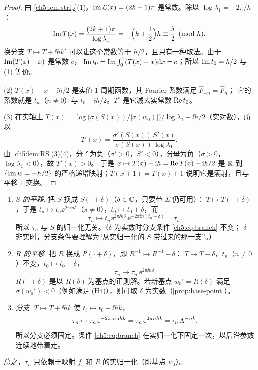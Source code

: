 \begin{proof}
由 \cref{ch5:lem:strip}(1)，$\operatorname{Im}\mathcal L(x)=(2k+1)\pi$ 是常数。除以 $\log\lambda_1=-2\pi/h$：
\[
 \operatorname{Im} T(x)=\frac{(2k+1)\pi}{\log\lambda_1}=-\Bigl(k+\frac12\Bigr)h\equiv\frac h2\pmod h .
\]
换分支 $T\mapsto T+\ii hk'$ 可以让这个常数等于 $h/2$，且只有一种取法。由于 $\operatorname{Im}(T(x)-x)$ 是常数 $c$，
$\operatorname{Im} t_0=\operatorname{Im}\int_0^1(T(x)-x)\mathrm{d} x=c$；所以 $\operatorname{Im} t_0=h/2$ 与 (1) 等价。

(2) $T(x)-x-\ii h/2$ 是实值 $1$-周期函数，其 Fourier 系数满足 $\hat F_{-n}=\overline{\hat F_n}$；
它的系数就是 $t_n$（$n\ne0$）与 $t_0-\ii h/2$。$T^\circ$ 是它减去实常数 $\operatorname{Re} t_0$。

(3) 在实轴上 $T(x)=\log\bigl(\sigma(S(x))/|\sigma(w_0)|\bigr)/\log\lambda_1+\ii h/2$（实对数），所以
\[
 T'(x)=\frac{\sigma'(S(x))\,S'(x)}{\sigma(S(x))\,\log\lambda_1}.
\]
由 \cref{ch5:lem:RS}(3)(4)，分子为负（$\sigma'>0$，$S'<0$），分母为负（$\sigma>0$，$\log\lambda_1<0$），故 $T'(x)>0$。
于是 $x\mapsto T(x)-\mathrm{i} h=\operatorname{Re} T(x)-\mathrm{i} h/2$ 是 $\mathbb{R}$ 到 $\{\operatorname{Im} w=-h/2\}$ 的严格递增映射；$T(x+1)=T(x)+1$
说明它是满射，且与平移 $1$ 交换。
\end{proof}

\begin{remark}\label{ch5:rem:normalisations}
\begin{enumerate}
\item \emph{$S$ 的平移.} 把 $S$ 换成 $S(\cdot+\delta)$（$\delta\in\mathbb{C}$，只要带 $\Sigma$ 仍可用）：
  $T\mapsto T(\cdot+\delta)$，于是 $t_n\mapsto t_n\ee^{2\pi\ii n\delta}$（$n\ne0$），$t_0\mapsto t_0+\delta$，而
  \[
   \tau_n\mapsto t_n\ee^{2\pi\ii n\delta}\,\ee^{-2\pi\ii n(t_0+\delta)}=\tau_n .
  \]
  所以 $\tau_n$ 与 $S$ 的归一化无关。（$\delta$ 为实数时分支条件 \eqref{ch5:eq:branch} 不变；
  $\delta$ 非实时，分支条件要理解为``从实归一化的 $S$ 带过来的那一支''。）
\item \emph{$R$ 的平移.} 把 $R$ 换成 $R(\cdot+\delta)$，即 $R^{-1}\mapsto R^{-1}-\delta$：
  $T\mapsto T-\delta$，$t_n$（$n\ne0$）不变，$t_0\mapsto t_0-\delta$，
  \[
   \tau_n\mapsto\tau_n\,\ee^{2\pi\ii n\delta}.
  \]
  $R(\cdot+\delta)$ 是以 $R(\delta)$ 为基点的正则解。若新基点 $w_0'=R(\delta)$ 满足 $\sigma(w_0')<0$（例如满足 (H4)），则可取 $\delta$ 为实数（\cref{prop:base-point}）。
\item \emph{分支.} $T\mapsto T+\ii hk$ 使 $t_0\mapsto t_0+\ii hk$，
  \[
   \tau_n\mapsto\tau_n\,\mathrm{e}^{-2\pi\mathrm{i} n\cdot\mathrm{i} hk}=\tau_n\,\mathrm{e}^{2\pi nhk}=\tau_n\,\Lambda^{-nk}.
  \]
  所以分支必须固定。条件 \eqref{ch5:eq:branch} 在实归一化下固定一次，以后沿参数连续地带着走。
\end{enumerate}
总之，$\tau_n$ 只依赖于映射 $f_s$ 和 $R$ 的实归一化（即基点 $w_0$）。
\end{remark}

